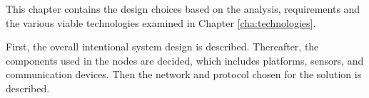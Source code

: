 \label{cha:designintro}

This chapter contains the design choices based on the analysis, requirements and the various viable technologies examined in Chapter \ref{cha:technologies}.

First, the overall intentional system design is described. Thereafter, the components used in the nodes are decided, which includes platforms, sensors, and communication devices.
Then the network and protocol chosen for the solution is described.




